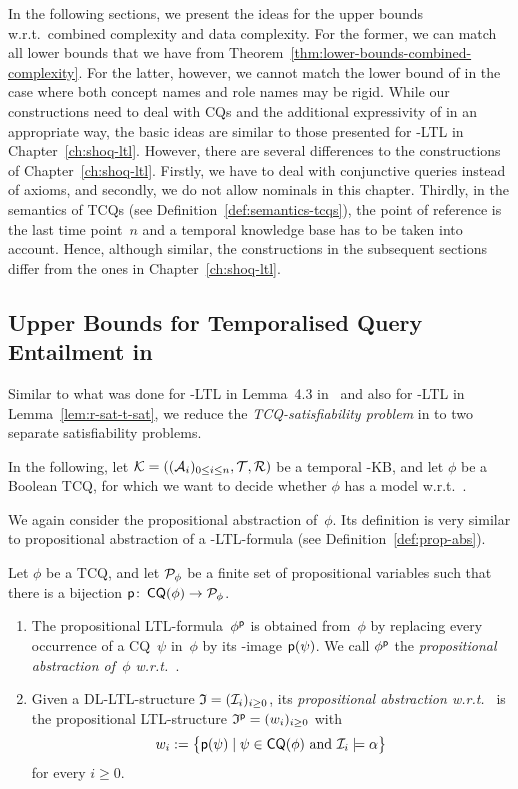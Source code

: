 In the following sections, we present the ideas for the upper bounds w.r.t.\
combined complexity and data complexity.  For the former, we can match all lower
bounds that we have from Theorem~\ref{thm:lower-bounds-combined-complexity}.
For the latter, however, we cannot match the lower bound of \coNP in the
case where both concept names and role names may be rigid.
%
While our constructions need to deal with CQs and the additional expressivity
of \SHQ in an appropriate way, the basic ideas are similar to those presented
for \SHOQ-LTL in Chapter~\ref{ch:shoq-ltl}.  However, there are several
differences to the constructions of Chapter~\ref{ch:shoq-ltl}.  Firstly, we have
to deal with conjunctive queries instead of axioms, and secondly, we do not
allow nominals in this chapter.  Thirdly, in the semantics of TCQs (see
Definition~\ref{def:semantics-tcqs}), the point of reference is the last time
point~$n$ and a temporal knowledge base has to be taken into account.  Hence,
although similar, the constructions in the subsequent sections differ from the
ones in Chapter~\ref{ch:shoq-ltl}.


\subsection{Upper Bounds for Temporalised Query Entailment in~\texorpdfstring{\SHQ}{SHQ}}\label{sec:tcq-upper-bounds}

Similar to what was done for \ALC-LTL in Lemma~4.3 in~\cite{BaGL-ToCL12} and
also for \SHOQ-LTL in Lemma~\ref{lem:r-sat-t-sat}, we reduce the
\emph{TCQ-satisfiability problem} in \SHQ to two separate satisfiability
problems.

In the following, let $\mathcal{K}=((\mathcal{A}_i)_{0\le i\le n},\mathcal{T},\mathcal{R})$ be a temporal
\SHQ-KB, and let $\phi$ be a Boolean TCQ, for which we want to decide whether
$\phi$ has a model w.r.t.~\Kmc.

We again consider the propositional abstraction of~$\phi$.  Its definition is
very similar to propositional abstraction of a \SHOQ-LTL-formula (see
Definition~\ref{def:prop-abs}).

\begin{definition}
    Let $\phi$ be a TCQ, and let $\mathcal{P}_\phi$ be a finite set of propositional
    variables such that there is a bijection $\mathsf{p}\colon\operatorname{\mathsf{CQ}}(\phi)\to\mathcal{P}_\phi$.
    \begin{enumerate}
        \item The propositional LTL-formula~$\phi^\mathsf{p}$ is obtained from~$\phi$
            by replacing every occurrence of a CQ~$\psi$ in~$\phi$ by its
            \psf-image $\mathsf{p}(\psi)$.  We call $\phi^\mathsf{p}$ the
            \emph{propositional abstraction of~$\phi$ w.r.t.~\psf}.
        \item Given a DL-LTL-structure $\mathfrak{I}=(\mathcal{I}_i)_{i\ge 0}$, its
            \emph{propositional abstraction w.r.t.~\psf} is the propositional
            LTL-structure $\mathfrak{I}^\mathsf{p}=(w_i)_{i\ge 0}$ with
            \[w_i:=\bigl\{\psf(\psi)\mid\psi\in\CQ(\phi)\ \text{and} \
                \Imc_i\models\alpha\bigr\}\]
            for every $i\ge 0$.
    \end{enumerate}
\end{definition}

